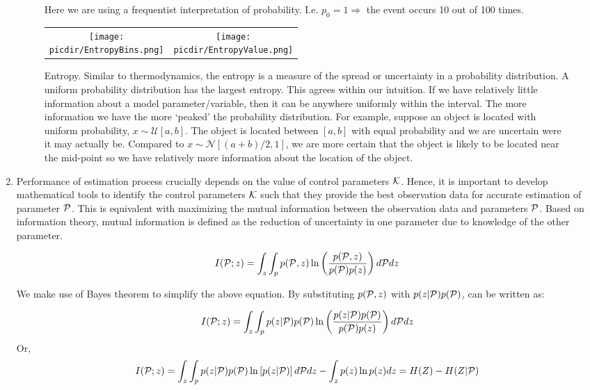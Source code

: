 \documentclass{article}         %
\theoremstyle{definition}
\theoremstyle{remark}
\newcommand{\picdir}{pdffig/}
\begin{document}
\begin{enumerate}
\begin{figure}[h]
Here we are using a frequentist interpretation of probability.
I.e. $p_0 = 1 \Rightarrow$  the event occurs 10 out of 100 times.
\centering
\begin{tabular}{cc}
\scalebox{0.41}{\texttt{[image: \\picdir/EntropyBins.png]}} 
&
\scalebox{0.41}{\texttt{[image: \\picdir/EntropyValue.png]}} 
\end{tabular}
\caption{Entropy.
Similar to thermodynamics, the entropy
is a measure of the spread or uncertainty in a probability
distribution. A uniform probability distribution has the largest entropy.
This agrees within our intuition. If we have relatively little information
about a model parameter/variable, then it can be anywhere uniformly within
the interval. The more information we have the more `peaked' the probability
distribution. For example, suppose  an object is located with uniform
probability, $x \sim \mathcal{U}[a,b]$. The object is located 
between $[a,b]$ with equal probability and we are uncertain were it may
actually be. Compared to $x \sim \mathcal{N}[(a+b)/2,1]$, we are more
certain that the object is likely to be located near the mid-point
so we have relatively more information about the location of the object.
}\label{Fig:entropy}
\end{figure}
\item
Performance of estimation process crucially depends on the
value of control parameters $\mathcal{K}$. Hence, it is important to develop
mathematical tools to identify the control parameters $\mathcal{K}$ such that they
provide the best observation data for accurate estimation of parameter $\mathcal{P}$.
This is equivalent with maximizing the mutual information between the
observation data and parameters $\mathcal{P}$. Based on information theory, mutual
information is defined as the reduction of uncertainty in one parameter due to
knowledge of the other parameter.

\begin{equation} \label{mi}
I(\mathcal{P};z)=\int_z\int_p p(\mathcal{P},z)\ln\left(\frac{p(\mathcal{P},z)}{p(\mathcal{P})p(z)}\right)d\mathcal{P} dz
\end{equation}

We make use of Bayes theorem to simplify the above equation. By substituting $p(\mathcal{P},z)$ with $p(z|\mathcal{P})p(\mathcal{P})$,  can be written as:

\begin{equation} \label{mi2}
I(\mathcal{P};z)=\int_z\int_p p(z|\mathcal{P})p(\mathcal{P})\ln\left(\frac{p(z|\mathcal{P})p(\mathcal{P})}{p(\mathcal{P})p(z)}\right)d\mathcal{P} dz
\end{equation}
Or,
\begin{equation} \label{mi3}
I(\mathcal{P};z)=\int_z\int_p p(z|\mathcal{P})p(\mathcal{P})\ln\left[p(z|\mathcal{P})\right]d\mathcal{P} dz - \int_z p(z) \ln p(z)dz
= H(Z) - H(Z|\mathcal{P})
\end{equation}



\end{enumerate}
\end{document}
